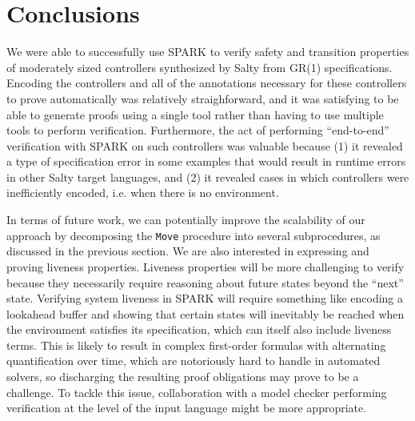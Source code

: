 \documentclass[runningheads]{llncs}
\begin{document}
\section{Conclusions}
\label{sec:conclusions}

We were able to successfully use SPARK to verify safety and transition properties of moderately sized controllers 
synthesized by Salty from GR(1) specifications. 
Encoding the controllers and all of the annotations necessary for these controllers to prove automatically was relatively straighforward, 
and it was satisfying to be able to generate proofs using a single tool rather than having to use multiple tools to perform verification.
Furthermore, the act of performing ``end-to-end'' verification with SPARK on such controllers was valuable because (1) it revealed a type of specification error in some examples that would result in  runtime errors in other Salty target languages, and (2) it revealed cases in which controllers were inefficiently encoded, i.e. when there is no environment.



In terms of future work, we can potentially improve the scalability of our approach by decomposing the \lstinline{Move} procedure 
into several subprocedures, as discussed in the previous section. 
We are also interested in expressing and proving liveness properties. 
Liveness properties will be more challenging to verify because they necessarily require reasoning about future states beyond the ``next'' state. 
Verifying system liveness in SPARK will require something like encoding a lookahead buffer and showing that certain states will inevitably be reached 
when the environment satisfies its specification, which can itself also include liveness terms. 
This is likely to result in complex first-order formulas with alternating quantification over time, which are 
notoriously hard to handle in automated solvers, so discharging the resulting proof obligations may prove to be a challenge.
To tackle this issue, collaboration with a model checker performing verification at the level of the input language might be more appropriate.

%
%
%
\newpage


\end{document}
